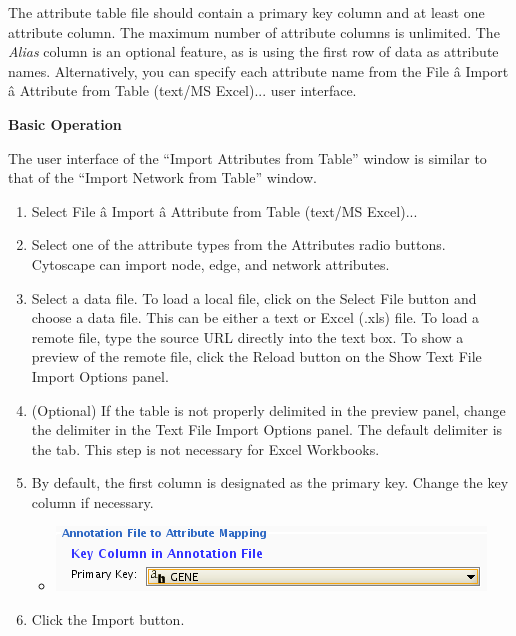  The attribute table file should contain a primary key column and at least one attribute column. The maximum number of attribute columns is unlimited. The \emph{Alias}
 column is an optional feature, as is using the first row of data as attribute names. Alternatively, you can specify each attribute name from the File \^a Import \^a Attribute from Table (text/MS Excel)... user interface. 


 \textbf{Basic Operation}


 The user interface of the ``Import Attributes from Table'' window is similar to that of the ``Import Network from Table'' window. 
\begin{enumerate}
\item 

 Select File \^a Import \^a Attribute from Table (text/MS Excel)... 

\item Select one of the attribute types from the Attributes radio buttons. Cytoscape can import node, edge, and network attributes. 
\item Select a data file. To load a local file, click on the Select File button and choose a data file. This can be either a text or Excel (.xls) file. To load a remote file, type the source URL directly into the text box. To show a preview of the remote file, click the Reload button on the Show Text File Import Options panel. 
\item (Optional) If the table is not properly delimited in the preview panel, change the delimiter in the Text File Import Options panel. The default delimiter is the tab. This step is not necessary for Excel Workbooks. 
\item By default, the first column is designated as the primary key. Change the key column if necessary. \begin{itemize}
\item 

 \includegraphics[width=\textwidth]{images/attribute_table_import_primary_key.png} 


\end{itemize}

\item Click the Import button. 

\end{enumerate}


